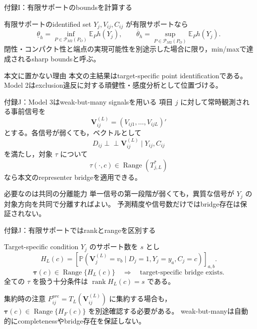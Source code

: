 \documentclass[aspectratio=169,10pt]{beamer}
\newcommand{\E}{\mathbb{E}}
\newcommand{\Prb}{\mathbb{P}}
\newcommand{\1}{\mathbf{1}}
\newcommand{\indep}{\mathrel{\perp\!\!\!\perp}}
\newcommand{\V}{\bm{V}}
\newcommand{\rank}{\operatorname{rank}}
\newcommand{\Range}{\operatorname{Range}}
\begin{document}
\begin{frame}{付録I：有限サポートのboundsを計算する}
\begin{alertblock}{有限サポートのidentified set}
$Y_j,V_{ij},C_{ij}$ が有限サポートなら
\[
\underline\theta_h
=\inf_{P\in\mathcal P_{M2}(P_O)}\E_Ph(Y_j),
\qquad
\overline\theta_h
=\sup_{P\in\mathcal P_{M2}(P_O)}\E_Ph(Y_j).
\]
閉性・コンパクト性と端点の実現可能性を別途示した場合に限り，min/maxで達成されるsharp boundsと呼ぶ。
\end{alertblock}
\begin{block}{本文に置かない理由}
本文の主結果はtarget-specific point identificationである。
Model 2はexclusion違反に対する頑健性・感度分析として位置づける。
\end{block}
\end{frame}

\begin{frame}{付録J：Model 3はweak-but-many signalsを用いる}
項目 $j$ に対して常時観測される事前信号を
\[
\V_{ij}^{(L)}=(V_{ij1},\ldots,V_{ijL})'
\]
とする。各信号が弱くても，ベクトルとして
\[
D_{ij}\indep\V_{ij}^{(L)}\mid Y_{ij},C_{ij}
\tag{M3-SV}
\]
を満たし，対象 $\tau$ について
\[
\tau(\cdot,c)\in\Range(T_{j,L}^*)
\tag{M3-R}
\]
なら本文のrepresenter bridgeを適用できる。
\begin{alertblock}{必要なのは共同の分離能力}
単一信号の第一段階が弱くても，異質な信号が $Y_j$ の対象方向を共同で分離すればよい。
予測精度や信号数だけではbridge存在は保証されない。
\end{alertblock}
\end{frame}

\begin{frame}{付録J：有限サポートではrankとrangeを区別する}
\begin{block}{Target-specific condition}
$Y_j$ のサポート数を $s$ とし
\[
H_L(c)=
\left[
\Prb(\V_j^{(L)}=v_b\mid D_j=1,Y_j=y_a,C_j=c)
\right]_{a,b}.
\]
\[
\bm\tau(c)\in\Range\{H_L(c)\}
\quad\Longrightarrow\quad
\text{target-specific bridge exists}.
\]
全ての $\tau$ を扱う十分条件は $\rank H_L(c)=s$ である。
\end{block}
\begin{alertblock}{集約時の注意}
$F_{ij}^{pre}=T_L(\V_{ij}^{(L)})$ に集約する場合も，
$\bm\tau(c)\in\Range\{H_F(c)\}$ を別途確認する必要がある。
weak-but-manyは自動的にcompletenessやbridge存在を保証しない。
\end{alertblock}
\end{frame}
\end{document}
